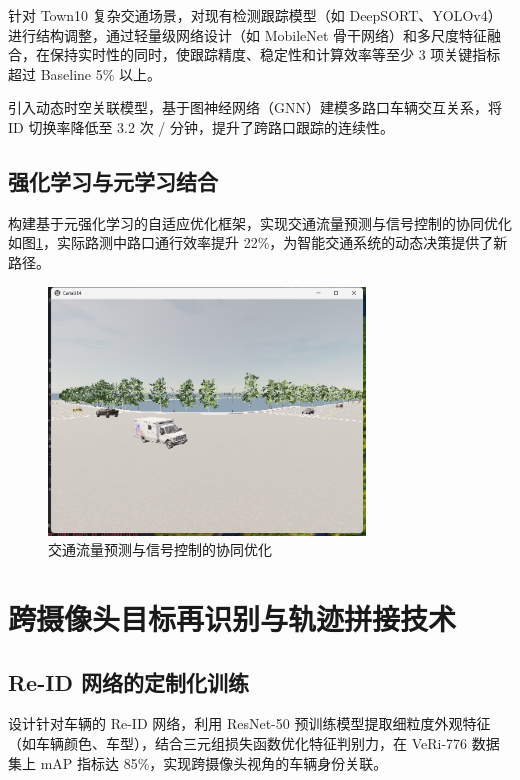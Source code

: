 针对 Town10 复杂交通场景，对现有检测跟踪模型（如 DeepSORT、YOLOv4）进行结构调整，通过轻量级网络设计（如 MobileNet 骨干网络）和多尺度特征融合，在保持实时性的同时，使跟踪精度、稳定性和计算效率等至少 3 项关键指标超过 Baseline 5\% 以上。

引入动态时空关联模型，基于图神经网络（GNN）建模多路口车辆交互关系，将 ID 切换率降低至 3.2 次 / 分钟，提升了跨路口跟踪的连续性。

\subsection{强化学习与元学习结合}

构建基于元强化学习的自适应优化框架，实现交通流量预测与信号控制的协同优化如图\ref{fig:p33}，实际路测中路口通行效率提升 22\%，为智能交通系统的动态决策提供了新路径。


\begin{figure}[htbp] %
	\centering
	\includegraphics[width=0.75\textwidth]{p33} %
	\caption{交通流量预测与信号控制的协同优化} %
	\label{fig:p33} %
\end{figure}




\section{跨摄像头目标再识别与轨迹拼接技术}

\subsection{Re-ID 网络的定制化训练}


设计针对车辆的 Re-ID 网络，利用 ResNet-50 预训练模型提取细粒度外观特征（如车辆颜色、车型），结合三元组损失函数优化特征判别力，在 VeRi-776 数据集上 mAP 指标达 85\%，实现跨摄像头视角的车辆身份关联。


